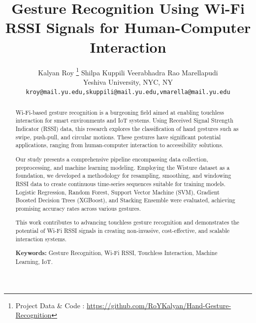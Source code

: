 \documentclass[10pt,twocolumn,letterpaper]{article}
\begin{document}
\title{
Gesture Recognition Using Wi-Fi RSSI Signals for Human-Computer Interaction}

\author{
Kalyan Roy \thanks{ Project Data \& Code : \url{https://github.com/RoYKalyan/Hand-Gesture-Recognition}}
\hspace{0.3cm} Shilpa Kuppili 
\hspace{0.3cm} Veerabhadra Rao Marellapudi 
\hspace{0.3cm} 
\\
Yeshiva University, NYC, NY\\
{\tt\small kroy@mail.yu.edu,skuppili@mail.yu.edu,vmarella@mail.yu.edu}
}

\maketitle
\ifwacvfinal\thispagestyle{empty}\fi


\begin{abstract}
    Wi-Fi-based gesture recognition is a burgeoning field aimed at enabling touchless interaction for smart environments and IoT systems. Using Received Signal Strength Indicator (RSSI) data, this research explores the classification of hand gestures such as swipe, push-pull, and circular motions. These gestures have significant potential applications, ranging from human-computer interaction to accessibility solutions.

    Our study presents a comprehensive pipeline encompassing data collection, preprocessing, and machine learning modeling. Employing the Wisture dataset as a foundation, we developed a methodology for resampling, smoothing, and windowing RSSI data to create continuous time-series sequences suitable for training models. Logistic Regression, Random Forest, Support Vector Machine (SVM), Gradient Boosted Decision Trees (XGBoost), and Stacking Ensemble were evaluated, achieving promising accuracy rates across various gestures.

    This work contributes to advancing touchless gesture recognition and demonstrates the potential of Wi-Fi RSSI signals in creating non-invasive, cost-effective, and scalable interaction systems. 

    \textbf{Keywords:} Gesture Recognition, Wi-Fi RSSI, Touchless Interaction, Machine Learning, IoT.
\end{abstract}
\end{document}

